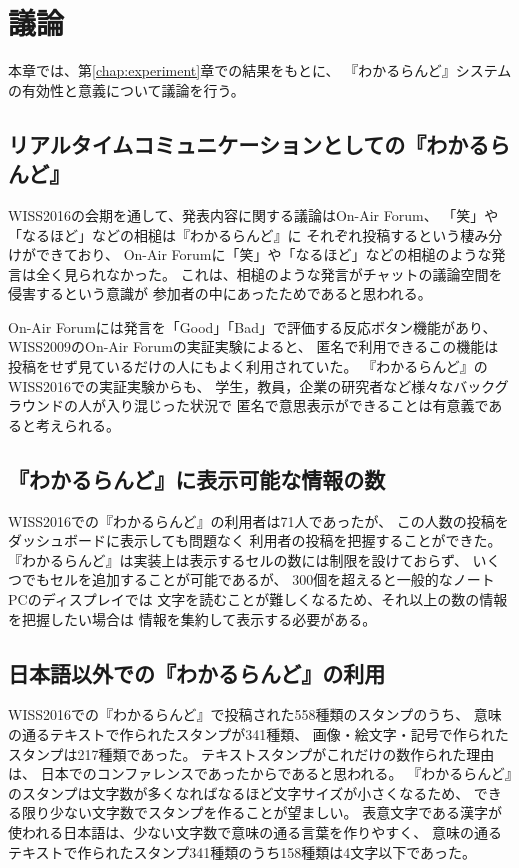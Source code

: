 \chapter{議論}
\label{chap:discussion}

本章では、第\ref{chap:experiment}章での結果をもとに、
『わかるらんど』システムの有効性と意義について議論を行う。

\newpage

\section{リアルタイムコミュニケーションとしての『わかるらんど』}

WISS2016の会期を通して、発表内容に関する議論はOn-Air Forum、
「笑」や「なるほど」などの相槌は『わかるらんど』に
それぞれ投稿するという棲み分けができており、
On-Air Forumに「笑」や「なるほど」などの相槌のような発言は全く見られなかった。
これは、相槌のような発言がチャットの議論空間を侵害するという意識が
参加者の中にあったためであると思われる。

On-Air Forumには発言を「Good」「Bad」で評価する反応ボタン機能があり、
WISS2009のOn-Air Forumの実証実験\cite{nishida2011}によると、
匿名で利用できるこの機能は投稿をせず見ているだけの人にもよく利用されていた。
『わかるらんど』のWISS2016での実証実験からも、
学生，教員，企業の研究者など様々なバックグラウンドの人が入り混じった状況で
匿名で意思表示ができることは有意義であると考えられる。


\section{『わかるらんど』に表示可能な情報の数}

WISS2016での『わかるらんど』の利用者は71人であったが、
この人数の投稿をダッシュボードに表示しても問題なく
利用者の投稿を把握することができた。
『わかるらんど』は実装上は表示するセルの数には制限を設けておらず、
いくつでもセルを追加することが可能であるが、
300個を超えると一般的なノートPCのディスプレイでは
文字を読むことが難しくなるため、それ以上の数の情報を把握したい場合は
情報を集約して表示する必要がある。


\section{日本語以外での『わかるらんど』の利用}

WISS2016での『わかるらんど』で投稿された558種類のスタンプのうち、
意味の通るテキストで作られたスタンプが341種類、
画像・絵文字・記号で作られたスタンプは217種類であった。
テキストスタンプがこれだけの数作られた理由は、
日本でのコンファレンスであったからであると思われる。
『わかるらんど』のスタンプは文字数が多くなればなるほど文字サイズが小さくなるため、
できる限り少ない文字数でスタンプを作ることが望ましい。
表意文字である漢字が使われる日本語は、少ない文字数で意味の通る言葉を作りやすく、
意味の通るテキストで作られたスタンプ341種類のうち158種類は4文字以下であった。

